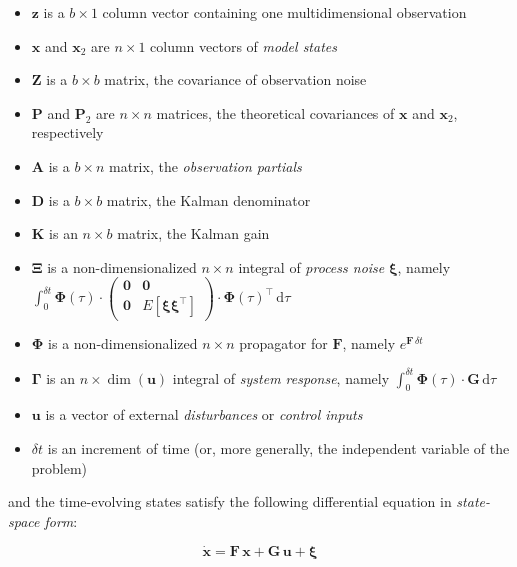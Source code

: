\documentclass[10pt,oneside,x11names]{article}
\begin{document}
\begin{itemize}
\item \(\mathbold{z}\) is a  \({b}\times{1}\) column vector containing one multidimensional observation
\item \(\mathbold{x}\) and \(\mathbold{x}_{2}\) are \({n}\times{1}\) column vectors of \emph{model states}
\item \(\mathbold{Z}\) is a  \({b}\times{b}\) matrix, the covariance of
observation noise
\item \(\mathbold{P}\) and \(\mathbold{P}_2\) are \({n}\times{n}\) matrices, the theoretical
covariances of \(\mathbold{x}\) and \(\mathbold{x}_2\), respectively
\item \(\mathbold{A}\) is a  \({b}\times{n}\) matrix, the \emph{observation partials}
\item \(\mathbold{D}\) is a  \({b}\times{b}\) matrix, the Kalman denominator
\item \(\mathbold{K}\) is an \({n}\times{b}\) matrix, the Kalman gain
\item \(\mathbold{\Xi}\) is a non-dimensionalized \(n\times{n}\) integral of \emph{process
noise} \(\mathbold{\xi}\), namely \newline \(\int_{0}^{\delta t}\mathbold{\Phi}(\tau)\cdot{\left(\begin{array}{c|c}\mathbold{0}&\mathbold{0}\\\hline\mathbold{0}&E\left[\mathbold{\xi}\mathbold{\xi}^{\intercal}\right]\end{array}\right)\cdot\mathbold{\Phi}(\tau)^\intercal\,\textrm{d}\tau}\)
\item \(\mathbold{\Phi}\) is a non-dimensionalized \(n\times{n}\) propagator for \(\mathbold{F}\), namely \(e^{\mathbold{F}\,{\delta t}}\)
\item \(\mathbold{\Gamma}\) is an \(n\times{\dim(\mathbold{u})}\) integral of \emph{system response}, namely \(\int_{0}^{\delta t}{\mathbold{\Phi}(\tau) \cdot \mathbold{G}\,\textrm{d}\tau}\)
\item \(\mathbold{u}\) is a vector of external \emph{disturbances} or \emph{control inputs}
\item \(\delta{t}\) is an increment of time (or, more generally, the independent
variable of the problem)
\end{itemize}

\noindent and the time-evolving states satisfy the following differential
equation in \emph{state-space form}:

\begin{equation}
\label{eqn:state-space-form}
{\dot{\mathbold{x}}}=
\mathbold{F}\,\mathbold{x}+
\mathbold{G}\,\mathbold{u}+
\mathbold{\xi}
\end{equation}
\end{document}
